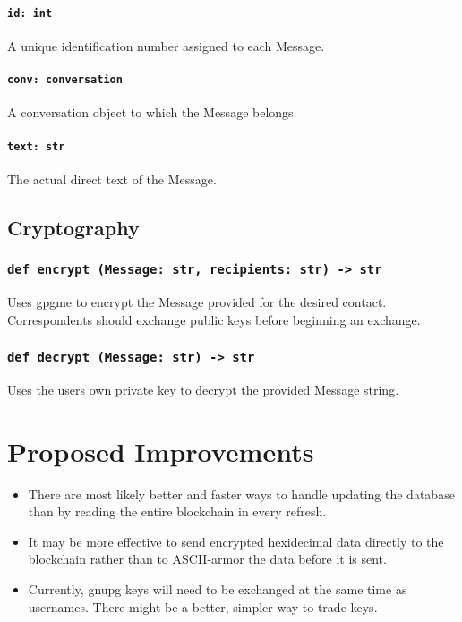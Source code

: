 \documentclass[]{article}
\begin{document}
\paragraph{\texttt{id: int}}
A unique identification number assigned to each Message.
\paragraph{\texttt{conv: conversation}}
A conversation object to which the Message belongs.
\paragraph{\texttt{text: str}}
The actual direct text of the Message.

\subsection{Cryptography}
\subsubsection{\texttt{def encrypt (Message: str, recipients: str) -> str}}
Uses gpgme to encrypt the Message provided for the desired contact. Correspondents should exchange public keys before beginning an exchange.
\subsubsection{\texttt{def decrypt (Message: str) -> str}}
Uses the users own private key to decrypt the provided Message string.

\section{Proposed Improvements}
\begin{itemize}
  \item There are most likely better and faster ways to handle updating the database than by reading the entire blockchain in every refresh.
  \item It may be more effective to send encrypted hexidecimal data directly to the blockchain rather than to ASCII-armor the data before it is sent.
  \item Currently, gnupg keys will need to be exchanged at the same time as usernames. There might be a better, simpler way to trade keys. 
\end{itemize}

\pagebreak

  \printbibliography{}
\end{document}
